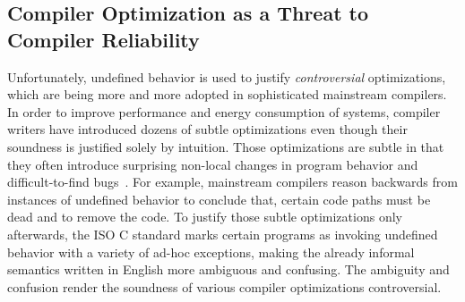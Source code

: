 



\subsection{Compiler Optimization as a Threat to Compiler Reliability}
\label{sec:introduction:problem}

Unfortunately, undefined behavior is used to justify \emph{controversial} optimizations, which are
being more and more adopted in sophisticated mainstream compilers.  In order to improve performance
and energy consumption of systems, compiler writers have introduced dozens of subtle optimizations
even though their soundness is justified solely by intuition.  Those optimizations are subtle in
that they often introduce surprising non-local changes in program behavior and difficult-to-find
bugs~\cite{wang2013towards,yang2011finding}.  For example, mainstream compilers reason backwards
from instances of undefined behavior to conclude that, \eg{} certain code paths must be dead and to
remove the code.  To justify those subtle optimizations only afterwards, the ISO C standard marks
certain programs as invoking undefined behavior with a variety of ad-hoc exceptions, making the
already informal semantics written in English more ambiguous and confusing.  The ambiguity and
confusion render the soundness of various compiler optimizations controversial.




